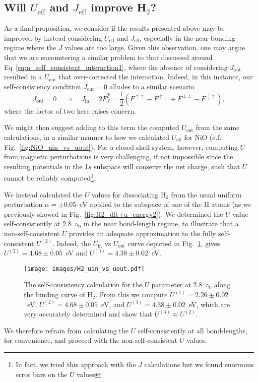 \subsection{Will $U_\textrm{eff}$ and $J_\textrm{eff}$ improve H$_2$?}
{
As a final proposition, 
we consider if the results presented above 
may be improved by instead considering 
$U_\textrm{eff}$ and $J_\textrm{eff}$, 
especially in the near-bonding regime 
where the $J$ values are too large. 
%
Given this observation,
one may argue that we are encountering 
a similar problem to that discussed around 
Eq~\ref{eq:u_self_consistent_interaction1}, 
where the absence of considering $J_\textrm{out}$ 
resulted in a $U_\textrm{out}$ that over-corrected the interaction.
%
Indeed, in this instance, 
our self-consistency condition $J_\textrm{out}=0$
alludes to a similar scenario 
%
\begin{equation}
J_\textrm{out}=0 
\quad\Rightarrow\quad 
J_\textrm{in}=2F_J^{\hat{P}}
=\frac{1}{2}\left(F^{\uparrow\uparrow}-F^{\uparrow\downarrow}
+F^{\downarrow\downarrow}-F^{\downarrow\uparrow}\right),
\end{equation}
%
where the factor of two here raises concern.}

We might then suggest 
adding to this term the computed $U_\textrm{out}$  
from the same calculations, 
in a similar manner to how we calculated 
$U_\textrm{eff}$ for NiO (c.f. Fig.~\ref{fig:NiO_uin_vs_uout}).
%
For a closed-shell system, however, 
computing $U$ from magnetic perturbations is very challenging, 
if not impossible 
since the resulting potentials in the 
1$s$ subspace will conserve the net charge, 
such that $U$ cannot be reliably 
computed\footnote{In fact, we tried this approach 
with the $J$ calculations but we found enormous error bars 
on the $U$ values}.

{
We instead calculated the $U$ values for dissociating H$_2$ 
from the usual uniform perturbation $\alpha=\pm0.05$~eV  
applied to the subspace of one of the H atoms 
(as we previously showed in Fig.~\ref{fig:H2_dft+u_energy2}).
%
We determined the $U$ value self-consistently 
at 2.8~a$_0$ in the near bond-length regime, 
to illustrate that a non-self-consistent $U$ 
provides an adequate approximation 
to the fully self-consistent  $U^{(2)}$.
%
Indeed, 
the $U_\textrm{in}$ vs $U_\textrm{out}$ 
curve depicted in Fig.~\ref{fig:H2_uin_vs_uout}, 
gives $U^{(2)}=4.68\pm0.05$~eV 
and $U^{(3)}=4.38\pm0.02$~eV. 
%
\begin{figure}[th!]
\centering
\texttt{[image: images/H2\_uin\_vs\_uout.pdf]}
\caption[The self-consistent $U$ profile for H$_2$ at 2.8~a$_0$]
{The self-consistency calculation 
for the $U$ parameter at 2.8~a$_0$ along 
the binding curve of H$_2$.
%
From this we compute 
$U^{(1)}=2.26\pm0.02$~eV,
$U^{(2)}=4.68\pm0.05$~eV, 
and $U^{(3)}=4.38\pm0.02$~eV, 
which are very accurately determined 
and show that 
$U^{(3)}\approx U^{(2)}$.}
\label{fig:H2_uin_vs_uout}
\end{figure}
%
We therefore refrain from calculating 
the $U$ self-consistently at all bond-lengths, for convenience, 
and proceed with the non-self-consistent $U$ values.}

